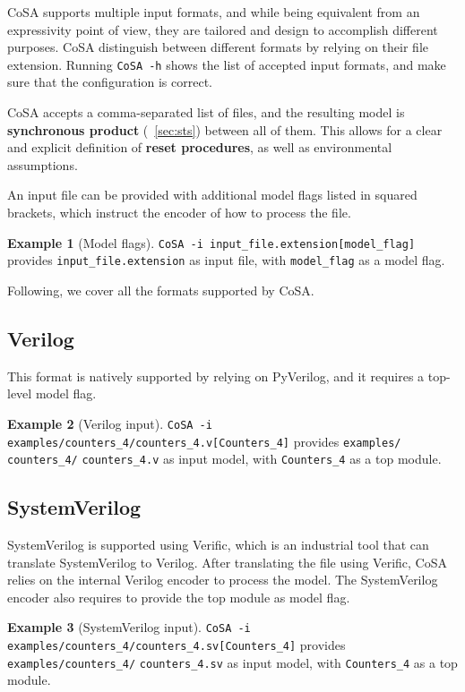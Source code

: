 \documentclass{article}
\theoremstyle{definition}
\newtheorem{example}{Example}[section]
\begin{document}
CoSA supports multiple input formats, and while being equivalent from
an expressivity point of view, they are tailored and design to
accomplish different purposes. CoSA distinguish between different
formats by relying on their file extension. Running \texttt{CoSA -h}
shows the list of accepted input formats, and make sure that the
configuration is correct.

CoSA accepts a comma-separated list of files, and the resulting model
is \textbf{synchronous product} (\textsection~\ref{sec:sts}) between
all of them. This allows for a clear and explicit definition of
\textbf{reset procedures}, as well as environmental assumptions.

An input file can be provided with additional model flags listed in
squared brackets, which instruct the encoder of how to process the
file.

\begin{example}[Model flags]
   \texttt{CoSA -i input\_file.extension[model\_flag]} provides
   \texttt{input\_file.extension} as input file, with
   \texttt{model\_flag} as a model flag.
\end{example}


Following, we cover all the formats supported by CoSA.

\subsection{Verilog}
This format is natively supported by relying on PyVerilog, and it
requires a top-level model flag.

\begin{example}[Verilog input]
  \texttt{CoSA -i examples/counters\_4/counters\_4.v[Counters\_4]}
  provides \texttt{examples/ counters\_4/} \texttt{counters\_4.v} as input model,
  with \texttt{Counters\_4} as a top module.
\end{example}

\subsection{SystemVerilog}
SystemVerilog is supported using Verific, which is an industrial tool
that can translate SystemVerilog to Verilog. After translating the
file using Verific, CoSA relies on the internal Verilog encoder to
process the model. The SystemVerilog encoder also requires to provide
the top module as model flag.

\begin{example}[SystemVerilog input]
  \texttt{CoSA -i examples/counters\_4/counters\_4.sv[Counters\_4]}
  provides \texttt{examples/counters\_4/} \texttt{counters\_4.sv} as input model,
  with \texttt{Counters\_4} as a top module.
\end{example}
\end{document}
